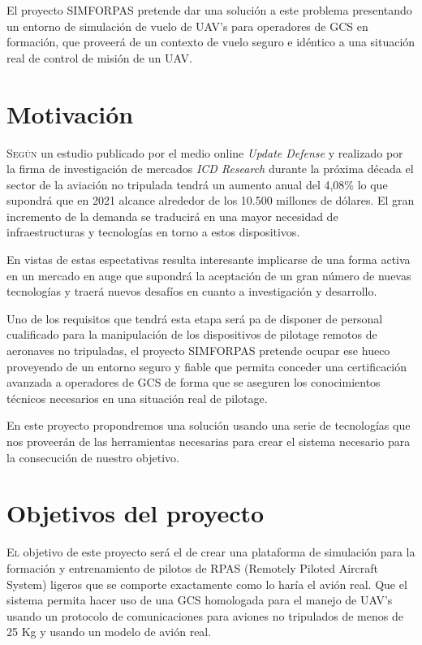 \documentclass[12pt,a4paper,spanish]{book} %
\begin{document}
El proyecto SIMFORPAS pretende dar una solución a este problema presentando un entorno de simulación de vuelo de UAV's para operadores de GCS en formación, que proveerá de un contexto de vuelo seguro e idéntico a una situación real de control de misión de un UAV.
\newpage
\section{Motivación}

\lettrine{S}{egún} un estudio publicado por el medio online \emph{Update Defense} y realizado por la firma de investigación de mercados \emph{ICD Research} durante la próxima década el sector de la aviación no tripulada tendrá un aumento anual del 4,08\% lo que supondrá que en 2021 alcance alrededor de los 10.500 millones de dólares. El gran incremento de la demanda  se traducirá en una mayor necesidad de infraestructuras y tecnologías en torno a estos dispositivos.

En vistas de estas espectativas resulta interesante implicarse de una forma activa en un mercado en auge que supondrá la aceptación de un gran número de nuevas tecnologías y traerá nuevos desafíos en cuanto a investigación y desarrollo.

Uno de los requisitos que tendrá esta etapa será pa de disponer de personal cualificado para la manipulación de los dispositivos de pilotage remotos de aeronaves no tripuladas, el proyecto SIMFORPAS pretende ocupar ese hueco proveyendo de un entorno seguro y fiable que permita conceder una certificación avanzada a operadores de GCS de forma que se aseguren los conocimientos técnicos necesarios en una situación real de pilotage.

En este proyecto propondremos una solución usando una serie de tecnologías que nos proveerán de las herramientas necesarias para crear el sistema necesario para la consecución de nuestro objetivo.

\newpage
\section{Objetivos del proyecto}

\lettrine{E}{l} objetivo de este proyecto será el de crear una plataforma de simulación para la formación y entrenamiento de pilotos de RPAS (Remotely Piloted Aircraft System) ligeros que se comporte exactamente como lo haría el avión real. Que el sistema permita hacer uso de una GCS homologada para el manejo de UAV's usando un protocolo de comunicaciones para aviones no tripulados de menos de 25 Kg y usando un modelo de avión real.
\end{document}
